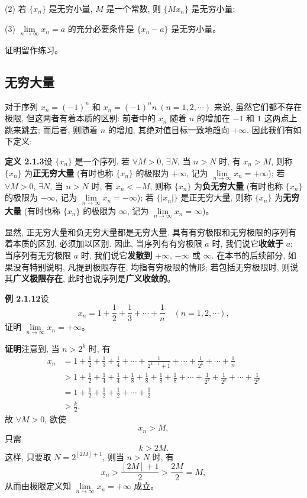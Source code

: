 \documentclass[UTF8, 12pt, fontset=fandol, oneside]{ctexart}
\begin{document}
(2) 若 $\{x_n\}$ 是无穷小量, $M$ 是一个常数, 则 $\{Mx_n\}$ 是无穷小量;

(3) $\lim\limits_{n\to\infty}x_n=a$ 的充分必要条件是 $\{x_n-a\}$ 是无穷小量。

证明留作练习。

\subsection{无穷大量}

对于序列 $x_n=(-1)^n$ 和 $x_n=(-1)^nn\ (n=1,2,\cdots)$ 来说, 虽然它们都不存在极限, 但这两者有着本质的区别: 前者中的 $x_n$ 随着 $n$ 的增加在 $-1$ 和 $1$ 这两点上跳来跳去; 而后者, 则随着 $n$ 的增加, 其绝对值目标一致地趋向 $+\infty$. 因此我们有如下定义:

\noindent\textbf{定义 2.1.3}\quad 设 $\{x_n\}$ 是一个序列. 若 $\forall M>0$, $\exists N$, 当 $n>N$ 时, 有 $x_n>M$, 则称 $\{x_n\}$ 为\textbf{正无穷大量} (有时也称 $\{x_n\}$ 的极限为 $+\infty$, 记为 $\lim\limits_{n\to\infty}x_n=+\infty$); 若 $\forall M>0$, $\exists N$, 当 $n>N$ 时, 有 $x_n<-M$, 则称 $\{x_n\}$ 为\textbf{负无穷大量} (有时也称 $\{x_n\}$ 的极限为 $-\infty$, 记为 $\lim\limits_{n\to\infty}x_n=-\infty$); 若 $\{|x_n|\}$ 是正无穷大量, 则称 $\{x_n\}$ 为\textbf{无穷大量} (有时也称 $\{x_n\}$ 的极限为 $\infty$, 记为 $\lim\limits_{n\to\infty}x_n=\infty$)。

显然, 正无穷大量和负无穷大量都是无穷大量. 具有有穷极限和无穷极限的序列有着本质的区别, 必须加以区别. 因此, 当序列有有穷极限 $a$ 时, 我们说它\textbf{收敛于} $a$; 当序列有无穷极限 $a$ 时, 我们说它\textbf{发散到} $+\infty$, $-\infty$ 或 $\infty$. 在本书的后续部分, 如果没有特别说明, 凡提到极限存在, 均指有穷极限的情形; 若包括无穷极限时, 则说其\textbf{广义极限存在}, 此时也说序列是\textbf{广义收敛的}。

\noindent\textbf{例 2.1.12}\quad 设
\[
  x_n=1+\frac12+\frac13+\cdots+\frac1n\quad(n=1,2,\cdots),
\]
证明 $\lim\limits_{n\to\infty}x_n=+\infty$。

\noindent\textbf{证明}\quad 注意到, 当 $n>2^k$ 时, 有
\[
\begin{aligned}
  x_n
  &=1+\frac12+\frac13+\frac14+\cdots+\frac1{2^{k-1}+1}
    +\cdots+\frac1{2^k}+\cdots+\frac1n\\
  &>1+\frac12+\frac14+\frac14+\frac18+\frac18+\frac18+\frac18
    +\cdots+\frac1{2^k}+\frac1{2^k}+\cdots+\frac1{2^k}\\
  &=1+\frac12+\frac12+\frac12+\cdots+\frac12\\
  &>\frac k2.
\end{aligned}
\]
故 $\forall M>0$, 欲使
\[
  x_n>M,
\]
只需
\[
  k>2M.
\]
这样, 只要取 $N=2^{[2M]+1}$, 则当 $n>N$ 时, 有
\[
  x_n>\frac{[2M]+1}{2}>\frac{2M}{2}=M,
\]
从而由极限定义知 $\lim\limits_{n\to\infty}x_n=+\infty$ 成立。
\end{document}
